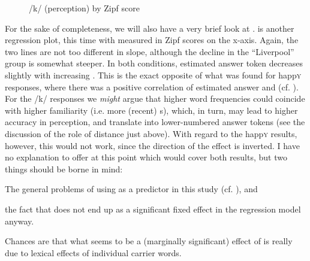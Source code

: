 \begin{figure}
	
		\resizebox{.49\linewidth}{!}{} 
	\caption{/k/ (perception) by Zipf score}
	\label{fig.scatter.k.ext.zipf}
\end{figure}

For the sake of completeness, we will also have a very brief look at .
 is another regression plot, this time with  measured in Zipf scores on the x-axis.
Again, the two lines are not too different in slope, although the decline in the ``Liverpool'' group is somewhat steeper.
In both  conditions, estimated answer token decreases slightly with increasing .
This is the exact opposite of what was found for happ\textsc{y} responses, where there was a positive correlation of estimated answer and  (cf. ).
For the /k/ responses we \emph{might} argue that higher word frequencies could coincide with higher familiarity (i.e. more (recent) s), which, in turn, may lead to higher accuracy in perception, and translate into lower-numbered answer tokens (see the discussion of the role of distance just above).
With regard to the happ\textsc{y} results, however, this would not work, since the direction of the effect is inverted.
I have no explanation to offer at this point which would cover both results, but two things should be borne in mind:
\begin{inparaenum}[(a)]
	\item The general problems of using  as a predictor in this study (cf. ), and
	\item the fact that  does not end up as a significant fixed effect in the regression model anyway.
\end{inparaenum}
Chances are that what seems to be a (marginally significant) effect of  is really due to lexical effects of individual carrier words.
